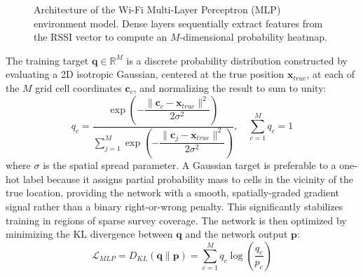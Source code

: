 \documentclass[conference]{IEEEtran}
\begin{document}
\begin{figure}[htbp]
\centering
{}
\caption{Architecture of the Wi-Fi Multi-Layer Perceptron (MLP) environment model. Dense layers sequentially extract features from the RSSI vector to compute an $M$-dimensional probability heatmap.}
\label{fig:mlp_arch}
\end{figure}

The training target $\mathbf{q} \in \mathbb{R}^M$ is a discrete probability distribution constructed by evaluating a 2D isotropic Gaussian, centered at the true position $\mathbf{x}_{true}$, at each of the $M$ grid cell coordinates $\mathbf{c}_c$, and normalizing the result to sum to unity:
\begin{equation}
q_c = \frac{\exp\!\left(-\dfrac{\|\mathbf{c}_c - \mathbf{x}_{true}\|^2}{2\sigma^2}\right)}{\displaystyle\sum_{j=1}^{M} \exp\!\left(-\dfrac{\|\mathbf{c}_j - \mathbf{x}_{true}\|^2}{2\sigma^2}\right)}, \quad \sum_{c=1}^{M} q_c = 1 \label{eq:target_q}
\end{equation}
where $\sigma$ is the spatial spread parameter. A Gaussian target is preferable to a one-hot label because it assigns partial probability mass to cells in the vicinity of the true location, providing the network with a smooth, spatially-graded gradient signal rather than a binary right-or-wrong penalty. This significantly stabilizes training in regions of sparse survey coverage. The network is then optimized by minimizing the KL divergence between $\mathbf{q}$ and the network output $\mathbf{p}$:
\begin{equation}
\mathcal{L}_{MLP} = D_{KL}(\mathbf{q} \parallel \mathbf{p}) = \sum_{c=1}^{M} q_c \log \left( \frac{q_c}{p_c} \right) \label{eq:kl_loss}
\end{equation}
\end{document}
